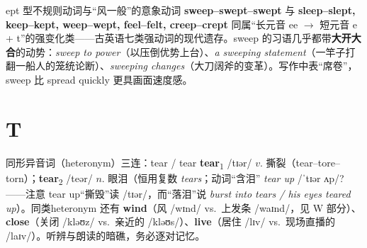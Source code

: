 \documentclass[../main.tex]{subfiles}
\begin{document}
\begin{gram}{ept 型不规则动词与“风一般”的意象动词}
\textbf{sweep--swept--swept} 与 \textbf{sleep--slept, keep--kept, weep--wept, feel--felt, creep--crept} 同属“长元音 ee $\to$ 短元音 e + t”的强变化类——古英语七类强动词的现代遗存。sweep 的习语几乎都带\textbf{大开大合}的动势：\textit{sweep to power}（以压倒优势上台）、\textit{a sweeping statement}（一竿子打翻一船人的笼统论断）、\textit{sweeping changes}（大刀阔斧的变革）。写作中表“席卷”，sweep 比 spread quickly 更具画面速度感。
\end{gram}

\section{T}



\begin{gram}{同形异音词（heteronym）三连：tear / tear}
\textbf{tear}\textsubscript{1} /tɪər/ $v.$ 撕裂（tear--tore--torn）；\textbf{tear}\textsubscript{2} /teər/ $n.$ 眼泪（恒用复数 \textit{tears}；动词“含泪” \textit{tear up} /ˈtɪər ʌp/?——注意 tear up“撕毁”读 /tɪər/，而“落泪”说 \textit{burst into tears / his eyes teared up}）。同类heteronym 还有 \textbf{wind}（风 /wɪnd/ vs.\ 上发条 /waɪnd/，见 W 部分）、\textbf{close}（关闭 /kləʊz/ vs.\ 亲近的 /kləʊs/）、\textbf{live}（居住 /lɪv/ vs.\ 现场直播的 /laɪv/）。听辨与朗读的暗礁，务必逐对记忆。
\end{gram}




\end{document}
